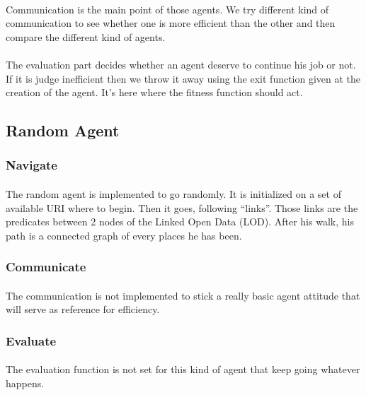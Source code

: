 \documentclass{article}
\begin{document}
		\paragraph{}
			Communication is the main point of those agents.
			We try different kind of communication to see whether one is more efficient than the other
			and then compare the different kind of agents.
		\paragraph{}
			The evaluation part decides whether an agent deserve to continue his job or not.
			If it is judge inefficient then we throw it away using the exit function given at the creation of the agent.
			It's here where the fitness function should act.
	\subsection{Random Agent}
		\subsubsection{Navigate}
			\paragraph{}
				The random agent is implemented to go randomly.
				It is initialized on a set of available URI where to begin.
				Then it goes, following ``links''.
				Those links are the predicates between 2 nodes of the Linked Open Data (LOD).
				After his walk, his path is a connected graph of every places he has been.
		\subsubsection{Communicate}
			\paragraph{}
				The communication is not implemented to stick a really basic agent attitude that will serve as reference for efficiency.
		\subsubsection{Evaluate}
			\paragraph{}
				The evaluation function is not set for this kind of agent that keep going whatever happens.
\end{document}
